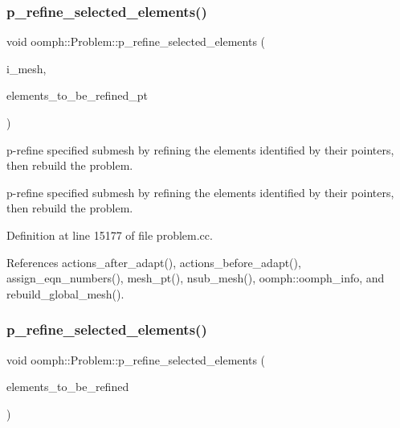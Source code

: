 \subsubsection{\texorpdfstring{p\+\_\+refine\+\_\+selected\+\_\+elements()}{p\_refine\_selected\_elements()}\hspace{0.1cm}{\footnotesize\ttfamily [4/6]}}
{\footnotesize\ttfamily void oomph\+::\+Problem\+::p\+\_\+refine\+\_\+selected\+\_\+elements (\begin{DoxyParamCaption}\item[{const unsigned \&}]{i\+\_\+mesh,  }\item[{const \hyperlink{classoomph_1_1Vector}{Vector}$<$ \hyperlink{classoomph_1_1PRefineableElement}{P\+Refineable\+Element} $\ast$$>$ \&}]{elements\+\_\+to\+\_\+be\+\_\+refined\+\_\+pt }\end{DoxyParamCaption})}



p-\/refine specified submesh by refining the elements identified by their pointers, then rebuild the problem. 

p-\/refine specified submesh by refining the elements identified by their pointers, then rebuild the problem. 

Definition at line 15177 of file problem.\+cc.



References actions\+\_\+after\+\_\+adapt(), actions\+\_\+before\+\_\+adapt(), assign\+\_\+eqn\+\_\+numbers(), mesh\+\_\+pt(), nsub\+\_\+mesh(), oomph\+::oomph\+\_\+info, and rebuild\+\_\+global\+\_\+mesh().

\mbox{\label{classoomph_1_1Problem_a4be6e85e73cd5c7f61763efe78f9fa9e}} 
\subsubsection{\texorpdfstring{p\+\_\+refine\+\_\+selected\+\_\+elements()}{p\_refine\_selected\_elements()}\hspace{0.1cm}{\footnotesize\ttfamily [5/6]}}
{\footnotesize\ttfamily void oomph\+::\+Problem\+::p\+\_\+refine\+\_\+selected\+\_\+elements (\begin{DoxyParamCaption}\item[{const \hyperlink{classoomph_1_1Vector}{Vector}$<$ \hyperlink{classoomph_1_1Vector}{Vector}$<$ unsigned $>$ $>$ \&}]{elements\+\_\+to\+\_\+be\+\_\+refined }\end{DoxyParamCaption})}



